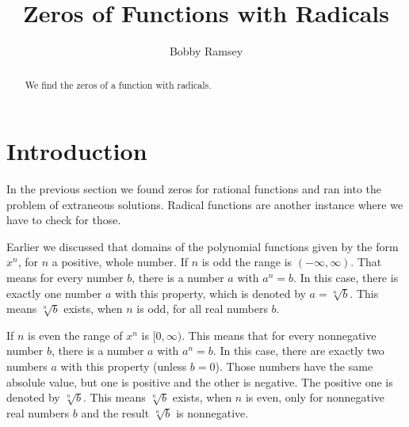 \documentclass[nooutcomes]{ximera}
\author{Bobby Ramsey}
\title{Zeros of Functions with Radicals}
\begin{document}
\licenseSZ
\begin{abstract}
 	We find the zeros of a function with radicals.
\end{abstract}
\maketitle




\section{Introduction}

	In the previous section we found zeros for rational functions and ran into the problem of extraneous solutions. 
	Radical functions are another instance where we have to check for those.

	\begin{callout}
		Earlier we discussed that domains of the polynomial functions given by the form $x^n$, for $n$ a positive, whole number.
		If $n$ is odd the range is $(-\infty, \infty)$. That means for every number $b$, there is a number $a$ with $a^n = b$. In this case,
		there is exactly one number $a$ with this property, which is denoted by $a = \sqrt[n]{b}$. This means $\sqrt[n]{b}$ exists, when $n$ is odd,
		for all real numbers $b$.
		
		If $n$ is even the range of $x^n$ is $[0, \infty)$. This means that for every nonnegative number $b$, there is a number $a$ with $a^n = b$. 
		In this case, there are exactly two numbers $a$ with this property (unless $b=0$). Those numbers have the same absolule value, but one is positive 
		and the other is negative. The positive one is denoted by $\sqrt[n]{b}$. This means $\sqrt[n]{b}$ exists, when $n$ is even, only for nonnegative real 
		numbers $b$ and the result $\sqrt[n]{b}$ is nonnegative.
	\end{callout}	
\end{document}
